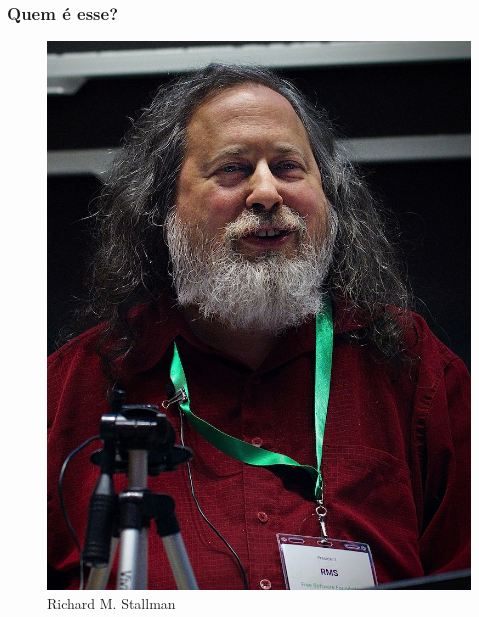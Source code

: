 \documentclass[xcolor=dvipsnames]{beamer}
\begin{document}
 \begin{frame}
 	\frametitle{Quem é esse?}
 	\begin{figure}
 	\begin{center}
 	\includegraphics[scale=0.18]{rms.jpg}\\
 	Richard M. Stallman
     
 	\end{center}
 	\end{figure}
 \end{frame}
\end{document}
